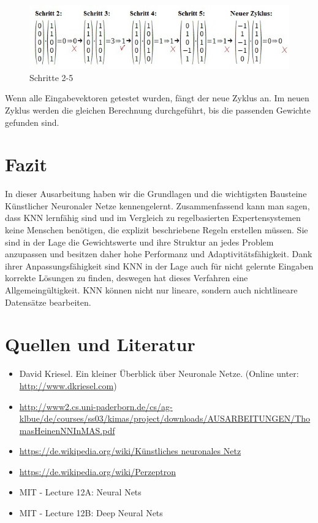 \begin{figure}[h]
\centering
\includegraphics[width=12cm]{chapters/neural_networks/schritte.jpg}

\caption{Schritte 2-5}

\end{figure}

Wenn alle Eingabevektoren getestet wurden, fängt der neue Zyklus an. Im neuen Zyklus werden die gleichen Berechnung durchgeführt, bis die passenden Gewichte gefunden sind.


\section{Fazit}

In dieser Ausarbeitung haben wir die Grundlagen und die wichtigsten Bausteine Künstlicher Neuronaler Netze kennengelernt. Zusammenfassend kann man sagen, dass KNN lernfähig sind und im Vergleich zu regelbasierten Expertensystemen keine Menschen  benötigen, die explizit beschriebene Regeln erstellen müssen. Sie sind in der Lage die Gewichtswerte und ihre Struktur an jedes Problem anzupassen und besitzen daher hohe Performanz und Adaptivitätsfähigkeit. Dank ihrer Anpassungsfähigkeit sind KNN in der Lage auch für nicht gelernte Eingaben korrekte Lösungen zu finden, deswegen hat dieses Verfahren eine Allgemeingültigkeit. KNN können nicht nur lineare, sondern auch nichtlineare Datensätze bearbeiten.

\section{Quellen und Literatur}
\begin{itemize}
\item David Kriesel. Ein kleiner Überblick über Neuronale Netze. (Online unter: \url{http://www.dkriesel.com})
\item \url{http://www2.cs.uni-paderborn.de/cs/ag-klbue/de/courses/ss03/kimas/project/downloads/AUSARBEITUNGEN/ThomasHeinenNNInMAS.pdf}
\item \url{https://de.wikipedia.org/wiki/Künstliches neuronales Netz}
\item \url{https://de.wikipedia.org/wiki/Perzeptron}
\item MIT - Lecture 12A: Neural Nets
\item MIT - Lecture 12B: Deep Neural Nets
\end{itemize}
